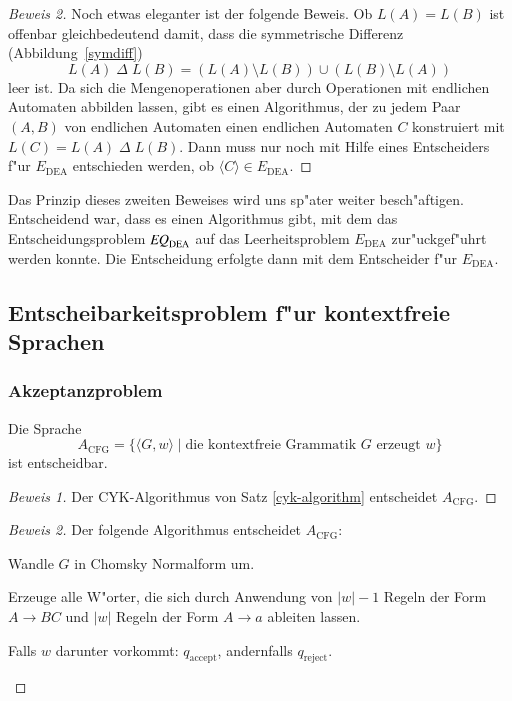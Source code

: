 \begin{proof}[Beweis 2]
Noch etwas eleganter ist der folgende Beweis. Ob $L(A)=L(B)$ ist
offenbar gleichbedeutend damit, dass die symmetrische Differenz
(Abbildung~\ref{symdiff})
\[
L(A){\;\Delta\;} L(B)=
(L(A)\setminus L(B)) \cup (L(B)\setminus L(A))
\]
leer ist.
Da sich die Mengenoperationen aber durch Operationen mit
endlichen Automaten abbilden lassen, gibt es einen Algorithmus,
der  zu jedem Paar $(A,B)$
von endlichen Automaten  einen endlichen Automaten $C$ konstruiert mit
$L(C)=L(A){\;\Delta\;} L(B)$. Dann muss nur noch mit Hilfe eines Entscheiders
f"ur $E_{\text{DEA}}$ entschieden werden, ob $\langle C\rangle\in
E_{\text{DEA}}$.
\end{proof}

Das Prinzip dieses zweiten Beweises wird uns sp"ater weiter besch"aftigen.
Entscheidend war, dass es einen Algorithmus gibt, mit dem das
Entscheidungsproblem 
$\text{\it EQ}_{\text{DEA}}$
auf das Leerheitsproblem
$E_{\text{DEA}}$ zur"uckgef"uhrt werden konnte. Die Entscheidung
erfolgte dann mit dem Entscheider f"ur
$E_{\text{DEA}}$.

\subsection{Entscheibarkeitsproblem f"ur kontextfreie Sprachen}
\subsubsection{Akzeptanzproblem}
\begin{satz}
\label{satz:acfg-entscheidbar}
Die Sprache
\[
A_{\text{CFG}}=\{
\langle G,w\rangle\;|\; \text{die kontextfreie Grammatik $G$ erzeugt $w$}
\}
\]
ist entscheidbar.
\end{satz}

\begin{proof}[Beweis 1]
Der CYK-Algorithmus von Satz \ref{cyk-algorithm} entscheidet
$A_{\text{CFG}}$.
\end{proof}

\begin{proof}[Beweis 2]
Der folgende Algorithmus entscheidet
$A_{\text{CFG}}$:
\medskip
\begin{compactenum}
\item Wandle $G$ in Chomsky Normalform um.
\item Erzeuge alle W"orter, die sich durch Anwendung
von $|w|-1$ Regeln der Form $A\to BC$ und $|w|$ Regeln
der Form $A\to a$ ableiten lassen. 
\item Falls $w$ darunter vorkommt: $q_{\text{accept}}$, 
andernfalls $q_{\text{reject}}$.
\end{compactenum}
\medskip
\end{proof}

